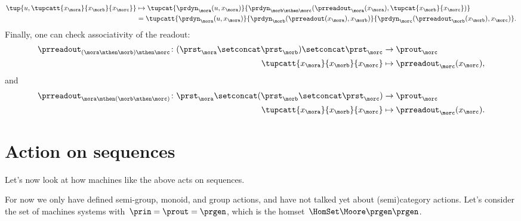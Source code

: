 \begin{solution}
\begin{equation*}
\begin{aligned}
            \tup{u, \tupcatt{x_{\mora}}{x_{\morb}}{x_\morc}}&\mapsto \tupcat{\prdyn_{\mora}(u,x_\mora)}{\prdyn_{\morb\mthen \morc}(\prreadout_{\mora}(x_\mora),\tupcat{x_\morb}{x_\morc})}\\
            &=\tupcatt{\prdyn_\mora(u,x_\mora)}{\prdyn_\morb(\prreadout(x_\mora),x_\morb)}{\prdyn_\morc(\prreadout_\morb(x_\morb),x_\morc)}.
        \end{aligned}
    \end{equation*}
    Finally, one can check associativity of the readout:
    \begin{equation*}
        \label{eq:assoc_moore_3}
        \begin{aligned}
            \prreadout_{(\mora \mthen \morb)\mthen \morc}\colon (\prst_\mora \setconcat \prst_\morb)\setconcat \prst_\morc &\to \prout_\morc\\
            \tupcatt{x_\mora}{x_\morb}{x_\morc} &\mapsto \prreadout_\morc(x_\morc),
        \end{aligned}
    \end{equation*}
    and
    \begin{equation*}
        \label{eq:assoc_moore_4}
        \begin{aligned}
            \prreadout_{\mora \mthen (\morb\mthen \morc)}\colon \prst_\mora \setconcat (\prst_\morb\setconcat \prst_\morc) &\to \prout_\morc\\
            \tupcatt{x_\mora}{x_\morb}{x_\morc} &\mapsto \prreadout_\morc(x_\morc).
        \end{aligned}
    \end{equation*}
\end{solution}


\section{Action on sequences}

Let's now look at how machines like the above acts on sequences.

For now we only have defined semi-group, monoid, and group actions, and have not talked yet about (semi)category actions.
Let's consider the set of machines systems with~$\prin = \prout = \prgen$, which is the homset~$\HomSet\Moore\prgen\prgen$.

